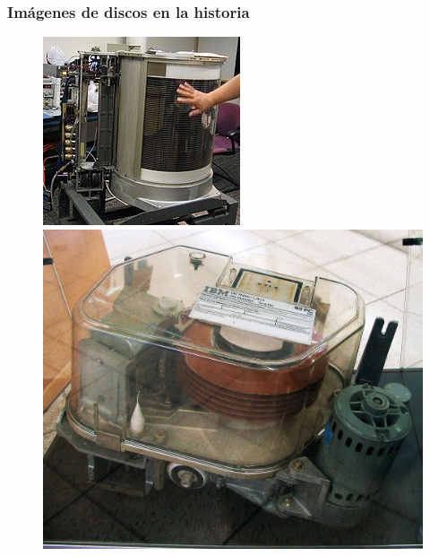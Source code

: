 \begin{frame}
  \frametitle{Imágenes de discos en la historia}
  \begin{figure}
    \includegraphics[scale=0.7]{images/oldDisk1.png}
    \includegraphics[scale=0.09]{images/oldDisk2.png}
  \end{figure}
\end{frame}

